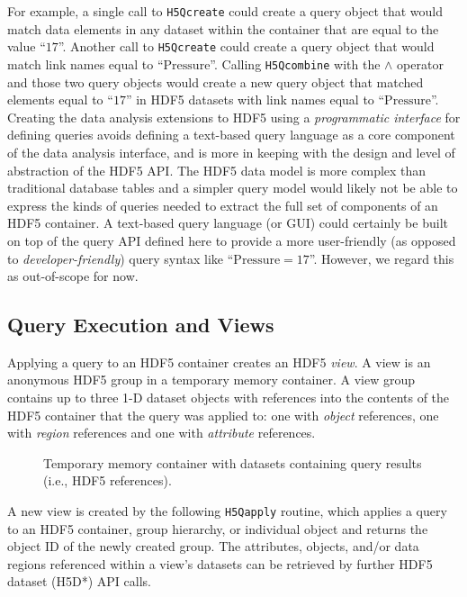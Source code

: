 For example, a single call to \texttt{H5Qcreate} could create a query object
that would match data elements in any dataset within the container that are
equal to the value ``$\mathrm{17}$''. Another call to \texttt{H5Qcreate} could create a
query object that would match link names equal to ``$\mathrm{Pressure}$''.
Calling \texttt{H5Qcombine} with the $\mathrm{\land}$ operator and those two query
objects would create a new query object that matched elements equal to ``$\mathrm{17}$''
in HDF5 datasets with link names equal to ``$\mathrm{Pressure}$''.
Creating the data analysis extensions to HDF5 using a \textit{programmatic
interface} for defining queries avoids defining a text-based query language
as a core component of the data analysis interface, and is more in keeping with
the design and level of abstraction of the HDF5 API.
The HDF5 data model is more complex than traditional database tables and a
simpler query model would likely not be able to express the kinds of queries
needed to extract the full set of components of an HDF5 container. A text-based
query language (or GUI) could certainly be built on top of the query API
defined here to provide a more user-friendly (as opposed to
\textit{developer-friendly}) query syntax like ``$\mathrm{Pressure = 17}$''.
However, we regard this as out-of-scope for now.

\subsection{Query Execution and Views}
Applying a query to an HDF5 container creates an HDF5 \textit{view}. A view is
an anonymous HDF5 group in a temporary memory container. A view group contains up to
three 1-D dataset objects with references into the contents of the HDF5 container
that the query was applied to:
one with \textit{object} references, one with \textit{region} references and
one with \textit{attribute} references.

\begin{figure}

\caption{Temporary memory container with datasets containing query results (i.e.,
HDF5 references).}
\label{fig:hdf5_view}
\vspace{-20pt}
\end{figure}

A new view is created by the
following \texttt{H5Qapply} routine, which applies a query to an HDF5 container,
group hierarchy, or individual object and returns the object ID of the newly created
group. The attributes, objects, and/or data regions referenced within a view's
datasets can be retrieved by further HDF5 dataset (H5D*) API calls.

